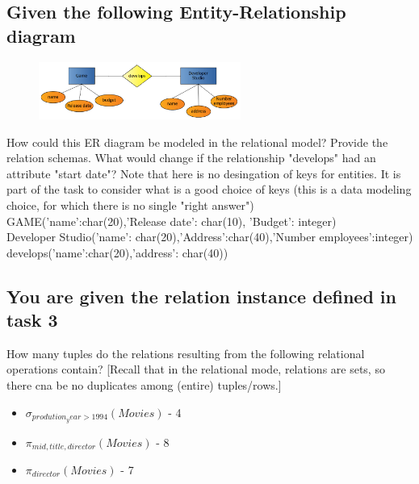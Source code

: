 \documentclass[12pt, a4paper]{article}
\begin{document}
		\subsection{Given the following Entity-Relationship diagram}
			\begin{figure}[h!]
				\centering
				\includegraphics[width=250px]{images/47,3.png}
				\label{}
				\caption{}
			\end{figure}
			How could this ER diagram be modeled in the relational model? Provide the relation schemas. What would change if the relationship "develops" had an attribute "start date"? Note that here is no desingation of keys for entities. It is part of the task to consider what is a good choice of keys (this is a data modeling choice, for which there is no single "right answer")	
			GAME('name':char(20),'Release date': char(10), 'Budget': integer)\\
			Developer Studio('name': char(20),'Address':char(40),'Number employees':integer)\\
			develops('name':char(20),'address': char(40))\\
		\subsection{You are given the relation instance defined in task 3}
		How many tuples do the relations resulting from the following relational operations contain? [Recall that in the relational mode, relations are sets, so there cna be no duplicates among (entire) tuples/rows.]
		\begin{itemize}
			\item $\sigma_{prodution_year>1994}(Movies)$ - 4
			\item $\pi_{mid,title,director}(Movies)$ - 8
			\item $\pi_{director}(Movies)$ - 7
		\end{itemize}
\end{document}
